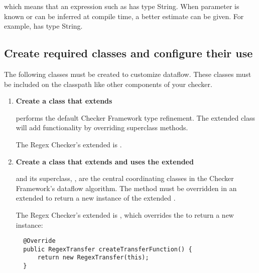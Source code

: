 \noindent
which means that an expression such as 
has type  String. When  parameter  is
known or can be inferred at compile time, a better estimate can be given.  For
example,  has type  String.

\subsection{Create required classes and configure their
  use\label{dataflow-create-classes}}

The following classes must be created to customize dataflow. These classes must
be included on the classpath like other components of your checker.

\begin{enumerate}
\item \textbf{Create a class that extends
    }

   performs the default Checker
  Framework type refinement.  The extended class will add functionality by
  overriding superclass methods.

  The Regex Checker's extended  is
  .

\item \textbf{Create a class that extends
     and uses the extended
    }

   and its superclass,
  , are the central coordinating classes
  in the Checker Framework's dataflow algorithm. The
   method must be overridden in an extended
   to return a new instance of the
  extended .

  The Regex Checker's extended  is
  , which overrides the
   to return a new
   instance:

\begin{smaller}
\begin{Verbatim}
  @Override
  public RegexTransfer createTransferFunction() {
      return new RegexTransfer(this);
  }
\end{Verbatim}
\end{smaller}


\end{enumerate}
